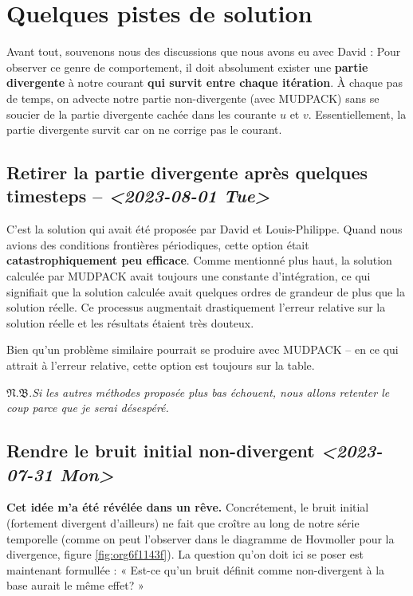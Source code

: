 \documentclass[10pt]{report}
\numberwithin{equation}{section}
\newcommand{\pt}{\hspace{1pt}} %
\newcommand{\nb}{\underline{{\footnotesize\EightStarConvex}\pt $\mathfrak{N.B.}$\vphantom{p}}\hspace{3pt}}
\begin{document}
\section{Quelques pistes de solution}
\label{sec:org7d80256}
Avant tout, souvenons nous des discussions que nous avons eu avec David : 
Pour observer ce genre de comportement, il doit absolument exister une \textbf{partie divergente} à notre courant \textbf{qui survit entre chaque itération}.
À chaque pas de temps, on advecte notre partie non-divergente (avec MUDPACK) sans se soucier de la partie divergente cachée dans les courante \(u\) et \(v\).
Essentiellement, la partie divergente survit car on ne corrige pas le courant.


\subsection{Retirer la partie divergente après quelques timesteps -- \textit{<2023-08-01 Tue>}}
\label{sec:orgcf4bf91}
C'est la solution qui avait été proposée par David et Louis-Philippe.
Quand nous avions des conditions frontières périodiques, cette option était \textbf{catastrophiquement peu efficace}.
Comme mentionné plus haut, la solution calculée par MUDPACK avait toujours une constante d'intégration, ce qui signifiait que la solution calculée avait quelques ordres de grandeur de plus que la solution réelle.
Ce processus augmentait drastiquement l'erreur relative sur la solution réelle et les résultats étaient très douteux.\bigskip

Bien qu'un problème similaire pourrait se produire avec MUDPACK -- en ce qui attrait à l'erreur relative, cette option est toujours sur la table.\bigskip

\nb \emph{Si les autres méthodes proposée plus bas échouent, nous allons retenter le coup parce que je serai désespéré.}

\subsection{Rendre le bruit initial non-divergent \textit{<2023-07-31 Mon>}}
\label{sec:orgf78e940}
\textbf{Cet idée m'a été révélée dans un rêve.}
Concrétement, le bruit initial (fortement divergent d'ailleurs) ne fait que croître au long de notre série temporelle (comme on peut l'observer dans le diagramme de Hovmoller pour la divergence, figure \ref{fig:org6f1143f}).
La question qu'on doit ici se poser est maintenant formullée : « Est-ce qu'un bruit définit comme non-divergent à la base aurait le même effet? »\bigskip
\end{document}

